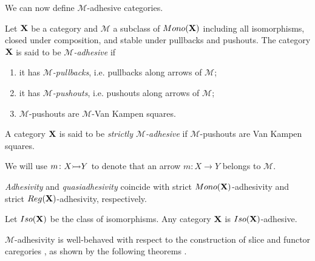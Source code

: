 \documentclass[a4paper,UKenglish,cleveref,pdftex, thm-restate,numberwithinsect,anonymous]{lipics}
\newcommand{\mon}{\mathsf{Mono}}
\newcommand{\reg}{\mathsf{Reg}}
\def\A{\textbf {\textup{A}}}
\newcommand{\mto}[0]{\scalebox{1}{$\rightarrowtail$}}
\def\B{\textbf {\textup{B}}}
\def\C{\textbf {\textup{C}}}
\def\X{\textbf {\textup{X}}}
\newcommand{\comma}[2]{#1\hspace{1pt} {\downarrow}\hspace{1pt} #2}
\newcommand{\cma}[2]{\mathcal{#1}\hspace{1pt} {\downarrow}\hspace{1pt} \mathcal{#2}}
\begin{document}
We can now define $\mathcal{M}$-adhesive categories.

\begin{definition}
  Let $\X$ be a category and $\mathcal{M}$ a subclass of
  $\mon(\X)$
  including  all isomorphisms, closed under composition,
  and stable under pullbacks and pushouts.
  The category
  $\X$ is said to be \emph{$\mathcal{M}$-adhesive} if
  \begin{enumerate}
  \item it has \emph{$\mathcal{M}$-pullbacks}, i.e. pullbacks along arrows of $\mathcal{M}$;
  \item it has \emph{$\mathcal{M}$-pushouts}, i.e. pushouts along arrows of $\mathcal{M}$;
  \item  $\mathcal{M}$-pushouts are $\mathcal{M}$-Van Kampen squares.
  \end{enumerate}
  
  A category $\X$ is said to be \emph{strictly $\mathcal{M}$-adhesive}
  if $\mathcal{M}$-pushouts are Van Kampen squares.
\end{definition}

We will use $m\colon X\mto Y$ to denote that an arrow $m\colon X\to Y$ belongs to $\mathcal{M}$.

\begin{remark}
  \label{rem:salva}
  \emph{Adhesivity} and \emph{quasiadhesivity} 
  \cite{lack2005adhesive,garner2012axioms} coincide with strict
  $\mon(\X) $-adhesivity and strict $\reg(\X)$-adhesivity,
  respectively.
\end{remark}

\begin{example}
  \label{rem:iso}
  Let $\mathsf{Iso(\X)}$ be the class of 
  isomorphisms. Any category $\X$ is $\mathsf{Iso(\X)}$-adhesive.
\end{example}

$\mathcal{M}$-adhesivity is well-behaved with respect to  the construction of slice and functor caregories \cite{mac2013categories}, as shown by the following theorems \cite{ehrig2006fundamentals,lack2005adhesive}.
\end{document}
